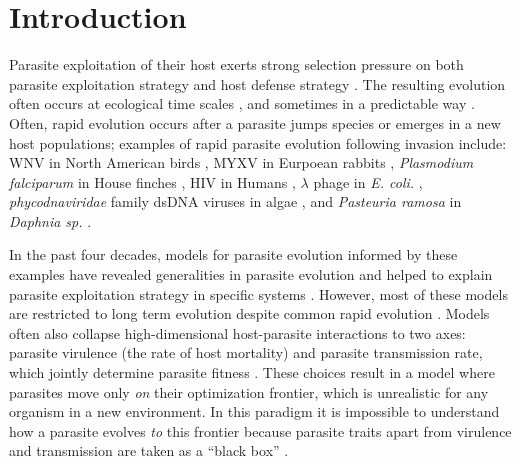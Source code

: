 \clearpage
\doublespacing

\section*{Introduction}

Parasite exploitation of their host exerts strong selection pressure on both parasite exploitation strategy and host defense strategy \citep{SchneiderandAyres2008, AyresandSchneider2012, KutzerandArmitage2016}. The resulting evolution often occurs at ecological time scales \citep{DayandProulx2004, Bolkeretal.2010, Lion2018}, and sometimes in a predictable way \citep{Ebert1998, Pugliese2002, Laineetal.2008, Frickeletal.2016}. Often, rapid evolution occurs after a parasite jumps species or emerges in a new host populations; examples of rapid parasite evolution following invasion include: WNV in North American birds \citep{Beasleyetal.2003}, MYXV in Eurpoean rabbits \citep{FennerandMarshall1957}, \emph{Plasmodium falciparum} in House finches \citep{Flemingetal.2018}, HIV in Humans \citep{Fraseretal.2007}, $\lambda$ phage in \emph{E. coli.} \citep{Berngruberetal.2015}, \emph{phycodnaviridae} family dsDNA viruses in algae \citep{Frickeletal.2016, Frickeletal.2018}, and \emph{Pasteuria ramosa} in \emph{Daphnia sp.} \citep{Duffyetal.2009}. 

In the past four decades, models for parasite evolution informed by these examples have revealed generalities in parasite evolution and helped to explain parasite exploitation strategy in specific systems \citep[for a review see][]{Cressleretal.2016}. However, most of these models are restricted to long term evolution despite common rapid evolution \citep[but see][]{Bolkeretal.2010, Lion2018, Parsonsetal.2018}. Models often also collapse high-dimensional host-parasite interactions to two axes: parasite virulence (the rate of host mortality) and parasite transmission rate, which jointly determine parasite fitness \citep{AndersonandMay1982, Ewald1983, AlizonandMichalakis2015, Cressleretal.2016}. These choices result in a model where parasites move only \emph{on} their optimization frontier, which is unrealistic for any organism in a new environment. In this paradigm it is impossible to understand how a parasite evolves \emph{to} this frontier because parasite traits apart from virulence and transmission are taken as a ``black box'' \citep{Alizonetal.2009, BullandLauring2014, AlizonandMichalakis2015}.

